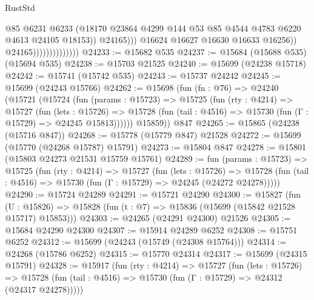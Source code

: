 \begin{lexlean}{RustStd}
\begin{coremodule}
                                            @85
                                            @6231
                                            @6233
                                            (@18170
                                              @23864
                                              @4299
                                              @144
                                              @53
                                              @85
                                              @4544
                                              @4783
                                              @6220
                                              @4613
                                              @24105
                                              @18153))
                                          @24165)))
                                    @16624
                                    @16627
                                    @16630
                                    @16633
                                    @16256))
                                @24165))))))))))))))
@24233 := @15682 @535
@24237 := @15684 (@15688 @535) (@15694 @535)
@24238 := @15703 @21525
@24240 := @15699 (@24238 @15718)
@24242 := @15741 (@15742 @535)
@24243 := @15737 @24242
@24245 := @15699 (@24243 @15766)
@24262 := @15698
    (fun (fn : @76) =>
    @24240
      (@15721
        (@15724
          (fun (params : @15723) =>
          @15725
            (fun (rty : @4214) =>
            @15727
              (fun (lets : @15726) =>
              @15728 (fun (tail : @4516) => @15730 (fun (Γ : @15729) => @24245 @15813))))))
        @15859))
    @847
@24265 := @15865 (@24238 (@15716 @847))
@24268 := @15778 (@15779 @847) @21528
@24272 := @15699 (@15770 (@24268 @15787) @15791)
@24273 := @15804 @847
@24278 := @15801 (@15803 @24273 @21531 @15759 @15761)
@24289 := fun (params : @15723) =>
  @15725
    (fun (rty : @4214) =>
    @15727
      (fun (lets : @15726) =>
      @15728 (fun (tail : @4516) => @15730 (fun (Γ : @15729) => @24245 (@24272 @24278)))))
@24290 := @15724 @24289
@24291 := @15721 @24290
@24300 := @15827
    (fun (U : @15826) => @15828 (fun (t : @7) => @15836 (@15699 (@15842 @21528 @15717) @15853)))
@24303 := @24265 (@24291 @24300) @21526
@24305 := @15684 @24290 @24300
@24307 := @15914 @24289 @6252
@24308 := @15751 @6252
@24312 := @15699 (@24243 (@15749 (@24308 @15764)))
@24314 := @24268 (@15786 @6252)
@24315 := @15770 @24314
@24317 := @15699 (@24315 @15791)
@24328 := @15917
    (fun (rty : @4214) =>
    @15727
      (fun (lets : @15726) =>
      @15728 (fun (tail : @4516) => @15730 (fun (Γ : @15729) => @24312 (@24317 @24278)))))

\end{coremodule}
\end{lexlean}
